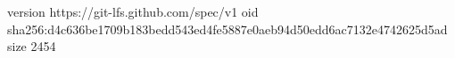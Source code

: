 version https://git-lfs.github.com/spec/v1
oid sha256:d4c636be1709b183bedd543ed4fe5887e0aeb94d50edd6ac7132e4742625d5ad
size 2454
